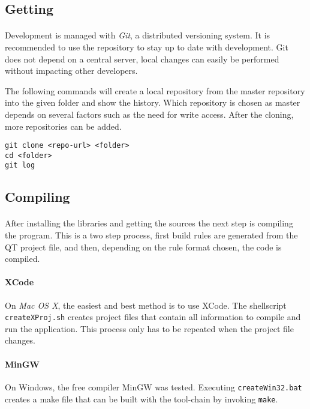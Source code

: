 \subsection{Getting \ER}
\paragraph{}
Development is managed with \textit{Git}\cite{git}, a distributed versioning system.
It is recommended to use the repository to stay up to date with development.
Git does not depend on a central server, local changes can easily be performed without impacting other developers.

The following commands will create a local repository from the master repository into the given folder and show the history.
Which repository is chosen as master depends on several factors such as the need for write access.
After the cloning, more repositories can be added.

\begin{verbatim}
git clone <repo-url> <folder>
cd <folder>
git log
\end{verbatim}


\subsection{Compiling}
\paragraph{}
After installing the libraries and getting the sources the next step is compiling the program.
This is a two step process, first build rules are generated from the QT project file, and then, depending on the rule format chosen, the code is compiled.

\paragraph{XCode}
On \textit{Mac OS X}, the easiest and best method is to use XCode.
The shellscript \texttt{createXProj.sh} creates project files that contain all information to compile and run the application.
This process only has to be repeated when the project file changes.

\paragraph{MinGW}
On Windows, the free compiler MinGW was tested.
Executing \texttt{createWin32.bat} creates a make file that can be built with the tool-chain by invoking \texttt{make}.


